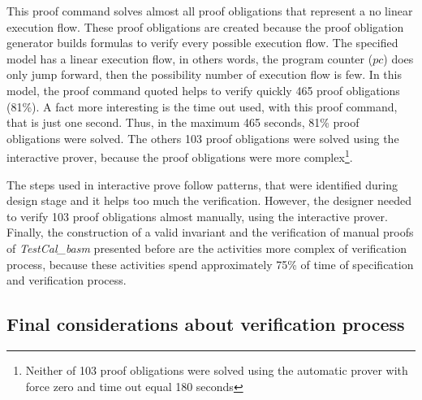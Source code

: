 \documentclass[11pt]{article} %
\begin{document}
This proof command solves almost all proof obligations that represent a no
linear execution flow. These proof obligations are created because the proof
obligation generator builds formulas to verify every possible execution flow.
The specified model has a linear execution flow, in others words, the program counter
($\mathit{pc}$) does only jump forward, then the possibility number of execution
flow is few. In this model, the proof command quoted helps to verify quickly
465 proof obligations (81\%). A fact more interesting is the time out used, with
this proof command, that is just one second. Thus, in the maximum 465 seconds,
81\% proof obligations were solved. The others 103 proof obligations were solved
using the interactive prover, because the proof obligations were more
complex\footnote{Neither of 103 proof obligations were solved using the
automatic prover with force zero and time out equal 180 seconds}.




The steps used in interactive prove follow patterns, that were identified during
design stage and it helps too much the verification. However, the designer needed
to verify 103 proof obligations almost manually, using the interactive prover.
Finally, the construction of a valid invariant and the verification of manual
proofs of \textit{TestCal\_basm} presented before are the activities more complex
of verification process, because these activities spend approximately 75\% of
time of specification and verification process.






\subsection{Final considerations about verification process}
\end{document}
